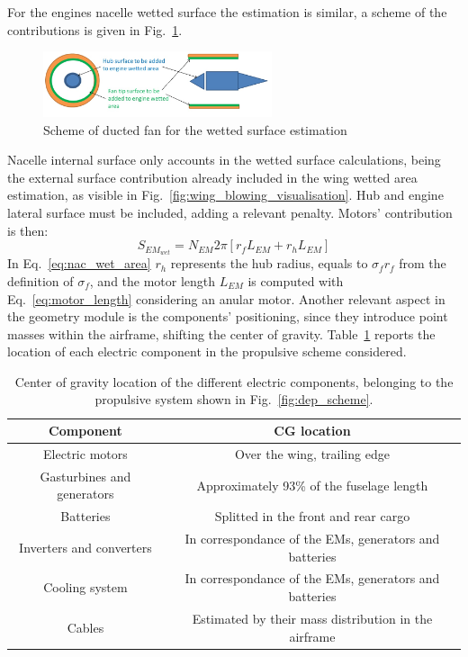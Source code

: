 For the engines nacelle wetted surface the estimation is similar, a scheme of the contributions is given in Fig.~\ref{fig:fan_wet_surf}.
\begin{figure}[!h]
	\centering
	\includegraphics[keepaspectratio, width=0.6\textwidth]{images/chap3/fan_wet_area.jpg}
	\caption{Scheme of ducted fan for the wetted surface estimation}
	\label{fig:fan_wet_surf}
\end{figure}
Nacelle internal surface only accounts in the wetted surface calculations, being the external surface contribution already included in the wing wetted area estimation, as visible in Fig.~\ref{fig:wing_blowing_visualisation}. 
Hub and engine lateral surface must be included, adding a relevant penalty. 
Motors' contribution is then:
\begin{equation}
	\label{eq:nac_wet_area}
	S_{{EM}_{wet}} = N_{EM} 2 \pi \left[r_fL_{EM} + r_{h}L_{EM}\right]
\end{equation}
In Eq.~\eqref{eq:nac_wet_area} $r_h$ represents the hub radius, equals to $\sigma_f r_f$ from the definition of $\sigma_f$, and the motor length $L_{EM}$ is computed with Eq.~\eqref{eq:motor_length} considering an anular motor. 
Another relevant aspect in the geometry module is the components' positioning, since they introduce point masses within the airframe, shifting the center of gravity. 
Table~\ref{tab:elec_comp_cg} reports the location of each electric component in the propulsive scheme considered. 
\begin{table}[!h]
	\centering
	\begin{tabular}{c c}
		\hline
		\textbf{Component} & \textbf{CG location} \\
		\hline
		Electric motors & Over the wing, trailing edge \\
		Gasturbines and generators & Approximately 93\% of the fuselage length \\
		Batteries & Splitted in the front and rear cargo \\
		Inverters and converters & In correspondance of the EMs, generators and batteries \\
		Cooling system & In correspondance of the EMs, generators and batteries \\
		Cables & Estimated by their mass distribution in the airframe \\		
		\hline
	\end{tabular}
	\caption{Center of gravity location of the different electric components, belonging to the propulsive system shown in Fig.~\ref{fig:dep_scheme}.}
	\label{tab:elec_comp_cg}
\end{table}

